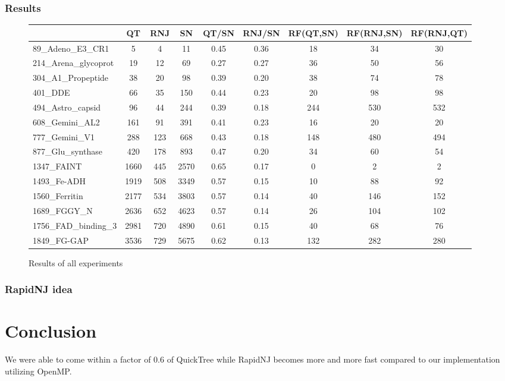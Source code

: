 \documentclass[a4paper,oneside,article,11pt]{memoir}
\begin{document}
\subsection*{Results }
\begin{figure}[H]
\begin{adjustwidth}{-2.3cm}{}
\begin{tabular}{l|c|c|c|c|c|c|c|c}
						& QT 	& RNJ 	& SN		& QT/SN 		& RNJ/SN & RF(QT,SN)	& RF(RNJ,SN) & RF(RNJ,QT) 	\\\hline
89\_Adeno\_E3\_CR1 		& 5 		& 4 		& 11   	& 0.45	 	& 0.36	 & 18		& 34			 & 30 			\\\hline
214\_Arena\_glycoprot 	& 19 	& 12 	& 69   	& 0.27 		& 0.27	 & 36		& 50			 & 56 			\\\hline
304\_A1\_Propeptide 		& 38 	& 20 	& 98   	& 0.39 		& 0.20	 & 38		& 74			 & 78 			\\\hline
401\_DDE 				& 66 	& 35 	& 150  	& 0.44 		& 0.23	 & 20		& 98			 & 98 			\\\hline
494\_Astro\_capsid 		& 96 	& 44 	& 244  	& 0.39 		& 0.18	 & 244		& 530		 & 532 			\\\hline
608\_Gemini\_AL2 		& 161 	& 91 	& 391  	& 0.41	 	& 0.23	 & 16		& 20			 & 20 			\\\hline
777\_Gemini\_V1 			& 288 	& 123 	& 668  	& 0.43 		& 0.18	 & 148		& 480		 & 494 			\\\hline
877\_Glu\_synthase 		& 420 	& 178 	& 893  	& 0.47 		& 0.20	 & 34		& 60			 & 54 			\\\hline
1347\_FAINT 				& 1660 	& 445	& 2570 	& 0.65 		& 0.17	 & 0			& 2			 & 2 			\\\hline
1493\_Fe-ADH 			& 1919 	& 508 	& 3349 	& 0.57 		& 0.15	 & 10		& 88			 & 92 			\\\hline
1560\_Ferritin 			& 2177 	& 534 	& 3803 	& 0.57 		& 0.14	 & 40		& 146		 & 152 			\\\hline
1689\_FGGY\_N 			& 2636 	& 652 	& 4623 	& 0.57 		& 0.14	 & 26		& 104		 & 102 			\\\hline
1756\_FAD\_binding\_3 	& 2981 	& 720 	& 4890 	& 0.61 		& 0.15	 & 40		& 68			 & 76 			\\\hline
1849\_FG-GAP 			& 3536 	& 729 	& 5675 	& 0.62 		& 0.13	 & 132		& 282		 & 280
\end{tabular}
\caption{\label{tab:results}Results of all experiments}
\end{adjustwidth}
\end{figure}

\subsection*{RapidNJ idea}


\chapter*{Conclusion}
We were able to come within a factor of $0.6$ of QuickTree while RapidNJ becomes more and more fast compared to our implementation utilizing OpenMP.


\end{document}
